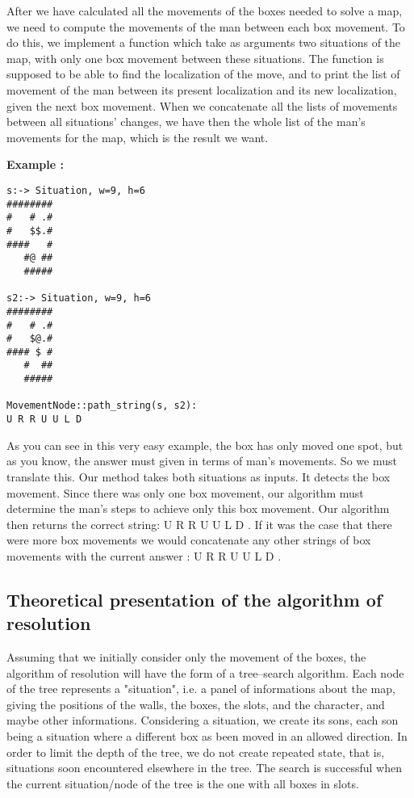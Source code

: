 \documentclass[journal]{IEEEtran}
\begin{document}
After we have calculated all the movements of the boxes needed to solve a map, we need to compute the movements of the man between each box movement. To do this, we implement a function which take as arguments two situations of the map, with only one box movement between these situations. The function is supposed to be able to find the localization of the move, and to print the list of movement of the man between its present localization and its new localization, given the next box movement. When we concatenate all the lists of movements between all situations' changes, we have then the whole list of the man's movements for the map, which is the result we want.

\textbf{Example :}

\begin{verbatim}
s:-> Situation, w=9, h=6
########
#   # .#
#   $$.#
####   #
   #@ ##
   #####

s2:-> Situation, w=9, h=6
########
#   # .#
#   $@.#
#### $ #
   #  ##
   #####

MovementNode::path_string(s, s2):
U R R U U L D
\end{verbatim}

As you can see in this very easy example, the box has only moved one spot, but as you know, the answer must given in terms of man's movements.  So we must translate this. Our method takes both situations as inputs. It detects the box movement. Since there was only one box movement, our algorithm must determine the man's steps to achieve only this box movement. Our algorithm then returns the correct string: U R R U U L D . If it was the case that there were more box movements we would concatenate any other strings of box movements with the current answer : U R R U U L D .


\subsection{Theoretical presentation of the algorithm of resolution}
Assuming that we initially consider only the movement of the boxes, the algorithm of resolution will have the form of a tree--search algorithm. Each node of the tree represents a "situation", i.e. a panel of informations about the map, giving the positions of the walls, the boxes, the slots, and the character, and maybe other informations. Considering a situation, we create its sons, each son being a situation where a different box as been moved in an allowed direction. In order to limit the depth of the tree, we do not create repeated state, that is, situations soon encountered elsewhere in the tree. The search is successful when the current situation/node of the tree is the one with all boxes in slots.\\
\end{document}
